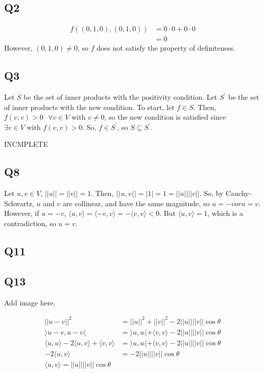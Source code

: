 \documentclass{article}
\begin{document}
\subsection*{Q2}
	\begin{align*}
		f((0, 1, 0), (0, 1, 0)) &= 0 \cdot 0 + 0\cdot 0\\
		&=0
	\end{align*}
	However, $(0, 1, 0) \neq 0$, so $f$ does not satisfy the property of definiteness.
	
\subsection*{Q3}
Let $S$ be the set of inner products with the positivity condition. 
Let  $S^\prime$ be the set of inner products with the new condition. To start, let $f \in S$. Then, $f(v, v) > 0 \text{ } \forall v \in V \text{ with } v \neq 0$, so the new condition is satisfied since $\exists v \in V \text{ with } f(v, v) > 0$. So, $f \in S^\prime$, so $S \subseteq S^\prime$. 
\begin{huge}
INCMPLETE
\end{huge}

\subsection*{Q8}
Let $u, v \in V$, $||u|| = ||v|| = 1$. Then, $|\rangle u, v \langle| = |1| = 1 = ||u|| ||v||$. So, by Cauchy-Schwartz, $u$ and $v$ are collinear, and have the same magnitude, so $u = -v or u = v$. However, if $u = -v$, $\langle u, v \rangle = \langle -v, v \rangle = - \langle v, v \rangle < 0$. But $\langle u, v \rangle = 1$, which is a contradiction, so $u = v$.

\subsection*{Q11}

\subsection*{Q13}
\begin{huge}
	Add image here.
\end{huge}
\begin{align*}
	||u - v||^2 &= ||u||^2 + ||v||^2 - 2||u|| ||v||\cos \theta\\
	\rangle u - v, u - v \langle &= \rangle u, u \langle + \langle v, v \rangle - 2 ||u|| ||v||\cos \theta\\
	\langle u, u \rangle - 2 \langle u, v \rangle + \langle v, v \rangle &= \rangle u, u \langle + \langle v, v \rangle - 2 ||u|| ||v||\cos \theta\\
	-2\langle u, v \rangle &= -2||u|| ||v||\cos \theta\\
	\langle u, v \rangle = ||u|| ||v||\cos \theta
\end{align*}
\end{document}
